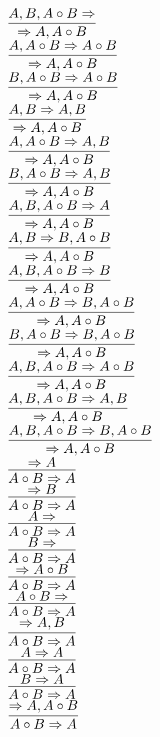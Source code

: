 \documentclass[11pt]{article}
\begin{document}
\begin{center}
\bigskip
\\$\infer{\Rightarrow A, A\circ B}{A, B, A\circ B\Rightarrow }$
\bigskip
\\$\infer{\Rightarrow A, A\circ B}{A, A\circ B\Rightarrow A\circ B}$
\bigskip
\\$\infer{\Rightarrow A, A\circ B}{B, A\circ B\Rightarrow A\circ B}$
\bigskip
\\$\infer{\Rightarrow A, A\circ B}{A, B\Rightarrow A, B}$
\bigskip
\\$\infer{\Rightarrow A, A\circ B}{A, A\circ B\Rightarrow A, B}$
\bigskip
\\$\infer{\Rightarrow A, A\circ B}{B, A\circ B\Rightarrow A, B}$
\bigskip
\\$\infer{\Rightarrow A, A\circ B}{A, B, A\circ B\Rightarrow A}$
\bigskip
\\$\infer{\Rightarrow A, A\circ B}{A, B\Rightarrow B, A\circ B}$
\bigskip
\\$\infer{\Rightarrow A, A\circ B}{A, B, A\circ B\Rightarrow B}$
\bigskip
\\$\infer{\Rightarrow A, A\circ B}{A, A\circ B\Rightarrow B, A\circ B}$
\bigskip
\\$\infer{\Rightarrow A, A\circ B}{B, A\circ B\Rightarrow B, A\circ B}$
\bigskip
\\$\infer{\Rightarrow A, A\circ B}{A, B, A\circ B\Rightarrow A\circ B}$
\bigskip
\\$\infer{\Rightarrow A, A\circ B}{A, B, A\circ B\Rightarrow A, B}$
\bigskip
\\$\infer{\Rightarrow A, A\circ B}{A, B, A\circ B\Rightarrow B, A\circ B}$
\bigskip
\\$\infer{A\circ B\Rightarrow A}{\Rightarrow A}$
\bigskip
\\$\infer{A\circ B\Rightarrow A}{\Rightarrow B}$
\bigskip
\\$\infer{A\circ B\Rightarrow A}{A\Rightarrow }$
\bigskip
\\$\infer{A\circ B\Rightarrow A}{B\Rightarrow }$
\bigskip
\\$\infer{A\circ B\Rightarrow A}{\Rightarrow A\circ B}$
\bigskip
\\$\infer{A\circ B\Rightarrow A}{A\circ B\Rightarrow }$
\bigskip
\\$\infer{A\circ B\Rightarrow A}{\Rightarrow A, B}$
\bigskip
\\$\infer{A\circ B\Rightarrow A}{A\Rightarrow A}$
\bigskip
\\$\infer{A\circ B\Rightarrow A}{B\Rightarrow A}$
\bigskip
\\$\infer{A\circ B\Rightarrow A}{\Rightarrow A, A\circ B}$

\end{center}
\end{document}
